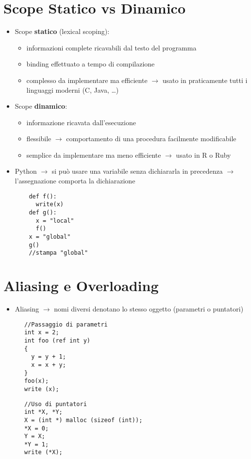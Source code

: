 \documentclass[12pt]{extarticle}
\begin{document}
\section*{Scope Statico vs Dinamico}
\begin{itemize}
  \item Scope \textbf{statico} (lexical scoping):
  \begin{itemize}
    \item informazioni complete ricavabili dal testo del programma
    \item binding effettuato a tempo di compilazione
    \item complesso da implementare ma efficiente $\rightarrow$ usato in praticamente tutti i linguaggi moderni (C, Java, \dots)
  \end{itemize}
  \item Scope \textbf{dinamico}:
  \begin{itemize}
    \item informazione ricavata dall'esecuzione
    \item flessibile $\rightarrow$ comportamento di una procedura facilmente modificabile
    \item semplice da implementare ma meno efficiente $\rightarrow$ usato in R o Ruby
  \end{itemize}
  \item Python $\rightarrow$ si può usare una variabile senza dichiararla in precedenza $\rightarrow$ l'assegnazione comporta la dichiarazione
  \begin{lstlisting}
    def f():
      write(x)
    def g():
      x = "local"
      f()
    x = "global"
    g()
    //stampa "global"
  \end{lstlisting}
\end{itemize}

\section*{Aliasing e Overloading}
\begin{itemize}
  \item Aliasing $\rightarrow$ nomi diversi denotano lo stesso oggetto (parametri o puntatori)
\end{itemize}

  \begin{multicols}{2}
    \begin{lstlisting}
      //Passaggio di parametri
      int x = 2;
      int foo (ref int y)
      {
        y = y + 1;
        x = x + y;
      }
      foo(x);
      write (x);
    \end{lstlisting}
    \columnbreak 
    \begin{lstlisting}
      //Uso di puntatori
      int *X, *Y;
      X = (int *) malloc (sizeof (int));
      *X = 0;
      Y = X;
      *Y = 1;
      write (*X);
    \end{lstlisting}
  \end{multicols}
\end{document}
